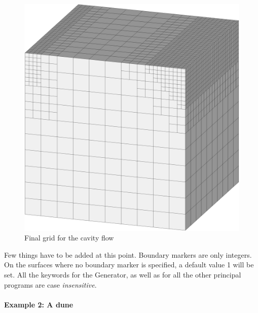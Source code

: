 \documentclass[10pt]{article}
\newcommand*{\tn}{\sffamily} %
\begin{document}
    \begin{figure}
    \centering
    \includegraphics[scale=0.3]{cavfinal_p10_m30_p10.eps}
    \caption{Final grid for the cavity flow}
    \label{cavfinal_p10_m30_p10}
    \end{figure}
    Few things have to be added at this point. Boundary markers     
    are only integers. On the surfaces where no boundary marker
    is specified, a default value 1 will be set. All the keywords for
    the {\tn Generator}, as well as for all the other principal
    programs are case {\em insensitive}. 
    
    \paragraph{Example 2: A dune}
\end{document}
